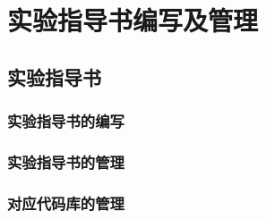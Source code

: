 
\chapter{实验指导书编写及管理}

\section{实验指导书}

\subsection{实验指导书的编写}

\subsection{实验指导书的管理}

\subsection{对应代码库的管理}

